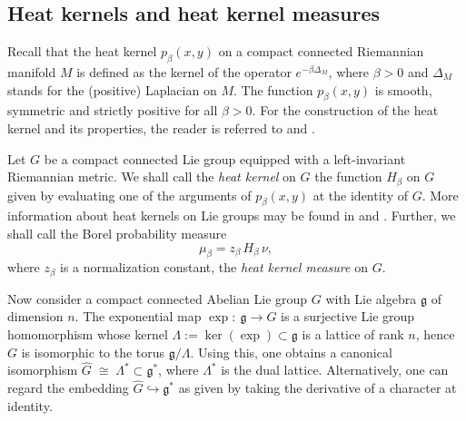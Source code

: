 \documentclass[11pt,reqno]{amsart}
\numberwithin{equation}{section}
\theoremstyle{remark}
\theoremstyle{rmdefinition}
\begin{document}
\subsection{Heat kernels and heat kernel measures}\label{hkermeassec}
Recall that the heat kernel $p_{\beta}(x,y)$ on a compact connected Riemannian manifold $M$ is defined as the kernel of the operator $e^{-\beta \Delta_M}$, where $\beta>0$ and $\Delta_M$ stands for the (positive) Laplacian on $M$. The function $p_{\beta}(x,y)$ is smooth, symmetric and strictly positive for all $\beta>0$. For the construction of the heat kernel and its properties, the reader is referred to \cite[Chapters 10 and 11]{Li} and \cite[Chapter 3]{Ro}.

Let $G$ be a compact connected Lie group equipped with a left-invariant Riemannian metric. We shall call the {\em heat kernel} on $G$ the function $H_{\beta}$ on $G$ given by evaluating one of the arguments of $p_{\beta}(x,y)$ at the identity of $G$. More information about heat kernels on Lie groups may be found in \cite{VSC} and \cite{Ma}.  Further, we shall call the Borel probability measure
$$ \mu_{\beta}=z_{\beta} \, H_{\beta} \, \nu, $$
where $z_{\beta}$ is a normalization constant, the {\em heat kernel measure} on $G$.

Now consider a compact connected Abelian Lie group $G$ with  Lie algebra $\mathfrak g$ of dimension $n$. The exponential map $\exp:\ \mathfrak g \longrightarrow G
$
is a surjective Lie group homomorphism whose kernel 
$
\Lambda := \ker(\exp) \subset \mathfrak g
$
is a lattice of rank $n$, hence $G$ is isomorphic to the torus $\mathfrak g / \Lambda$. Using this, one obtains a canonical isomorphism 
$\widehat{G} \;\cong\; \Lambda^* \subset \mathfrak g^*$, where $\Lambda^*$ is the dual lattice. Alternatively, one can regard the embedding $\widehat{G} \hookrightarrow \mathfrak g^*$ as given by taking the derivative of a character at identity.
\end{document}
